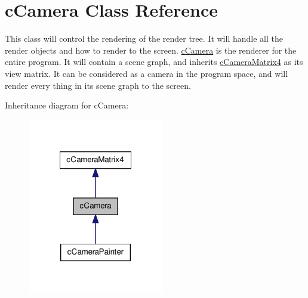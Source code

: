 \hypertarget{classc_camera}{
\section{cCamera Class Reference}
\label{classc_camera}
}


This class will control the rendering of the render tree. It will handle all the render objects and how to render to the screen. \hyperlink{classc_camera}{cCamera} is the renderer for the entire program. It will contain a scene graph, and inherits \hyperlink{classc_camera_matrix4}{cCameraMatrix4} as its view matrix. It can be considered as a camera in the program space, and will render every thing in its scene graph to the screen.  




Inheritance diagram for cCamera:
\nopagebreak
\begin{figure}[H]
\begin{center}
\leavevmode
\includegraphics[width=168pt]{classc_camera__inherit__graph}
\end{center}
\end{figure}



